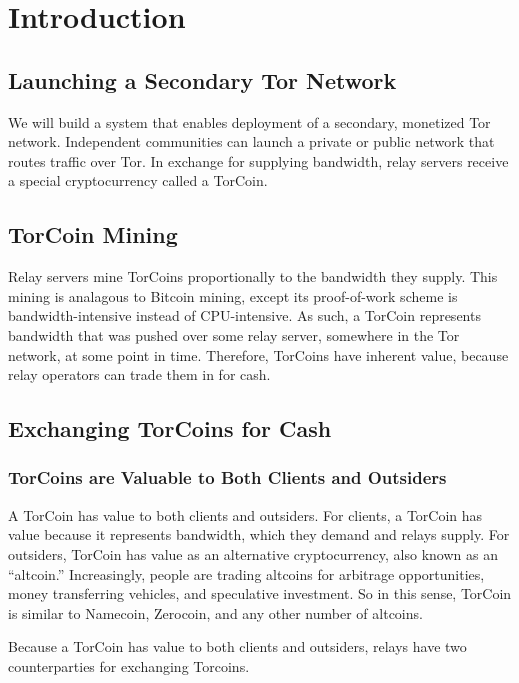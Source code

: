 \section{Introduction}

\subsection{Launching a Secondary Tor Network}

We will build a system that enables deployment of a secondary, monetized Tor network. Independent communities can launch a private or public network that routes traffic over Tor. In exchange for supplying bandwidth, relay servers receive a special cryptocurrency called a TorCoin.

\subsection{TorCoin Mining}

Relay servers mine TorCoins proportionally to the bandwidth they supply. This mining is analagous to Bitcoin mining, except its proof-of-work scheme is bandwidth-intensive instead of CPU-intensive. As such, a TorCoin represents bandwidth that was pushed over some relay server, somewhere in the Tor network, at some point in time. Therefore, TorCoins have inherent value, because relay operators can trade them in for cash. 

\subsection{Exchanging TorCoins for Cash}

\subsubsection{TorCoins are Valuable to Both Clients and Outsiders}

A TorCoin has value to both clients and outsiders. For clients, a TorCoin has value because it represents bandwidth, which they demand and relays supply. For outsiders, TorCoin has value as an alternative cryptocurrency, also known as an “altcoin.” Increasingly, people are trading altcoins for arbitrage opportunities, money transferring vehicles, and speculative investment. So in this sense, TorCoin is similar to Namecoin, Zerocoin, and any other number of altcoins. 

Because a TorCoin has value to both clients and outsiders, relays have two counterparties for exchanging Torcoins.

